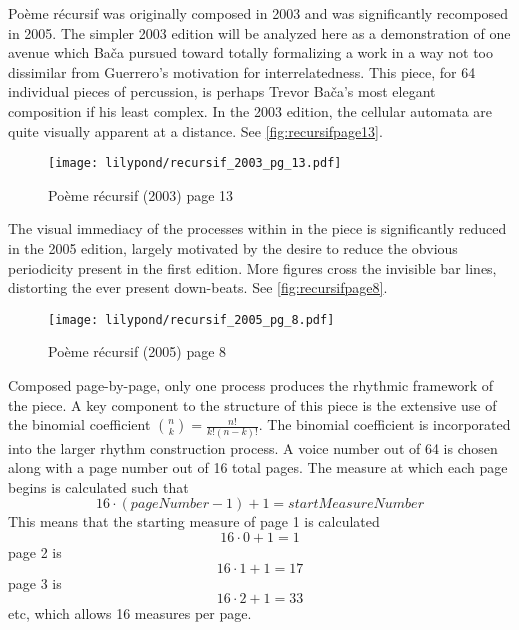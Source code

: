 Po\`eme r\'ecursif was originally composed in 2003 and was significantly recomposed in 2005. The simpler 2003 edition will be analyzed here as a demonstration of one avenue which Bača pursued toward totally formalizing a work in a way not too dissimilar from Guerrero's motivation for interrelatedness. This piece, for 64 individual pieces of percussion, is perhaps Trevor Ba\v{c}a's most elegant composition if his least complex. In the 2003 edition, the cellular automata are quite visually apparent at a distance. See \autoref{fig:recursifpage13}.
\begin{figure}[p] %
    \centering
    \texttt{[image: lilypond/recursif\_2003\_pg\_13.pdf]}
    \caption{Po\`eme r\'ecursif (2003) page 13}
    \label{fig:recursifpage13}
\end{figure}

The visual immediacy of the processes within in the piece is significantly reduced in the 2005 edition, largely motivated by the desire to reduce the obvious periodicity present in the first edition. More figures cross the invisible bar lines, distorting the ever present down-beats. See \autoref{fig:recursifpage8}.

\begin{figure}[p] %
    \centering
    \texttt{[image: lilypond/recursif\_2005\_pg\_8.pdf]}
    \caption{Po\`eme r\'ecursif (2005) page 8}
    \label{fig:recursifpage8}
\end{figure}

Composed page-by-page, only one process produces the rhythmic framework of the piece. A key component to the structure of this piece is the extensive use of the binomial coefficient $\binom{n}{k} = \frac{n!}{k!(n-k)!}$. The binomial coefficient is incorporated into the larger rhythm construction process. A voice number out of 64 is chosen along with a page number out of 16 total pages. The measure at which each page begins is calculated such that \begin{equation}16 \cdot (pageNumber - 1) + 1 = startMeasureNumber\end{equation} This means that the starting measure of page 1 is calculated \begin{equation}16 \cdot 0 + 1 = 1\end{equation} page 2 is \begin{equation}16 \cdot 1 + 1 = 17\end{equation} page 3 is \begin{equation}16 \cdot 2 + 1 = 33\end{equation} etc, which allows 16 measures per page.

